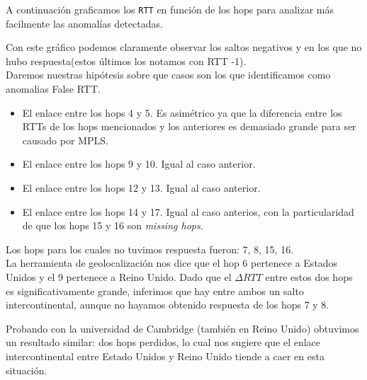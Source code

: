 A continuación graficamos los \texttt{RTT} en función de los hops para analizar más facilmente las anomalías detectadas.

\begin{figure}[H]
    \centering
\end{figure}

Con este gráfico podemos claramente observar los saltos negativos y en los que no hubo respuesta(estos
últimos los notamos con RTT -1).\\

Daremos nuestras hipótesis sobre que casos son los que identificamos como anomalias False RTT.\\

\begin{itemize}
\item El enlace entre los hops 4 y 5. Es asimétrico ya que la diferencia entre los RTTs de los hops mencionados y los anteriores es demasiado grande para ser causado por MPLS.
\item El enlace entre los hops 9 y 10. Igual al caso anterior.
\item El enlace entre los hops 12 y 13. Igual al caso anterior.
\item El enlace entre los hops 14 y 17. Igual al caso anterios, con la particularidad de que los hops 15 y 16 son \textit{missing hops}.
\end{itemize}

Los hops para los cuales no tuvimos respuesta fueron: 7, 8, 15, 16.\\

La herramienta de geolocalización nos dice que el hop 6 pertenece a Estados Unidos y el 9 pertenece a Reino Unido.
Dado que el $\Delta RTT$ entre estos dos hops es significativamente grande, inferimos que hay entre ambos un salto intercontinental, aunque no hayamos obtenido respuesta de los hops 7 y 8.

Probando con la universidad de Cambridge (también en Reino Unido) obtuvimos un resultado similar: dos hops perdidos, lo cual nos sugiere que el enlace intercontinental entre Estado Unidos y Reino Unido tiende a caer en esta situación.

